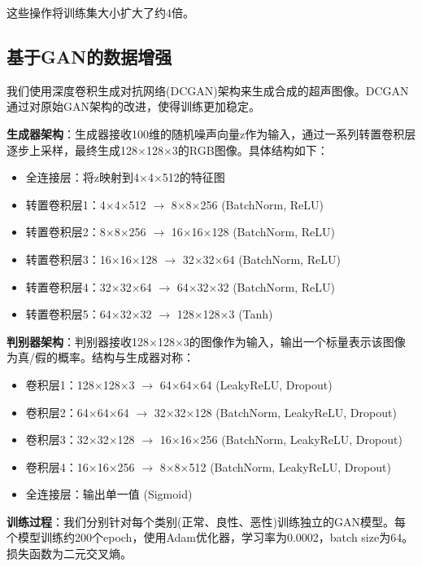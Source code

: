 \documentclass[supercite]{../Hust-undergraduate-translation/Experimental_Report}
\theoremstyle{definition}
\begin{document}
这些操作将训练集大小扩大了约4倍。

\subsection{基于GAN的数据增强}

我们使用深度卷积生成对抗网络(DCGAN)架构来生成合成的超声图像。DCGAN通过对原始GAN架构的改进，使得训练更加稳定。

\textbf{生成器架构}：生成器接收100维的随机噪声向量z作为输入，通过一系列转置卷积层逐步上采样，最终生成128$\times$128$\times$3的RGB图像。具体结构如下：
\begin{itemize}
\item 全连接层：将z映射到4$\times$4$\times$512的特征图
\item 转置卷积层1：4$\times$4$\times$512 $\rightarrow$ 8$\times$8$\times$256 (BatchNorm, ReLU)
\item 转置卷积层2：8$\times$8$\times$256 $\rightarrow$ 16$\times$16$\times$128 (BatchNorm, ReLU)
\item 转置卷积层3：16$\times$16$\times$128 $\rightarrow$ 32$\times$32$\times$64 (BatchNorm, ReLU)
\item 转置卷积层4：32$\times$32$\times$64 $\rightarrow$ 64$\times$32$\times$32 (BatchNorm, ReLU)
\item 转置卷积层5：64$\times$32$\times$32 $\rightarrow$ 128$\times$128$\times$3 (Tanh)
\end{itemize}

\textbf{判别器架构}：判别器接收128$\times$128$\times$3的图像作为输入，输出一个标量表示该图像为真/假的概率。结构与生成器对称：
\begin{itemize}
\item 卷积层1：128$\times$128$\times$3 $\rightarrow$ 64$\times$64$\times$64 (LeakyReLU, Dropout)
\item 卷积层2：64$\times$64$\times$64 $\rightarrow$ 32$\times$32$\times$128 (BatchNorm, LeakyReLU, Dropout)
\item 卷积层3：32$\times$32$\times$128 $\rightarrow$ 16$\times$16$\times$256 (BatchNorm, LeakyReLU, Dropout)
\item 卷积层4：16$\times$16$\times$256 $\rightarrow$ 8$\times$8$\times$512 (BatchNorm, LeakyReLU, Dropout)
\item 全连接层：输出单一值 (Sigmoid)
\end{itemize}

\textbf{训练过程}：我们分别针对每个类别(正常、良性、恶性)训练独立的GAN模型。每个模型训练约200个epoch，使用Adam优化器，学习率为0.0002，batch size为64。损失函数为二元交叉熵。
\end{document}
